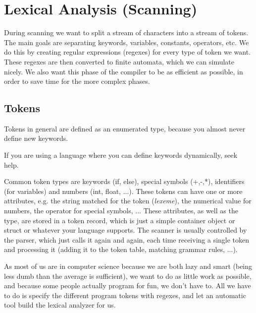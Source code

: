 \documentclass{article}
\begin{document}
\section{Lexical Analysis (Scanning)}
During scanning we want to split a stream of characters into a stream of tokens.
The main goals are separating keywords, variables, constants, operators, etc.
We do this by creating regular expressions (regexes) for every type of token we want.
These regexes are then converted to finite automata, which we can simulate nicely.
We also want this phase of the compiler to be as efficient as possible, in order to save time for the more complex phases.

\subsection{Tokens}
Tokens in general are defined as an enumerated type, because you almost never define new keywords.
\begin{keypointbox}
	If you are using a language where you can define keywords dynamically, seek help.
\end{keypointbox}

Common token types are keywords (if, else), special symbols (+,-,*), identifiers (for variables) and numbers (int, float, ...).
These tokens can have one or more attributes, e.g. the string matched for the token (\emph{lexeme}), the numerical value for numbers, the operator for special symbols, ...
These attributes, as well as the type, are stored in a token record, which is just a simple container object or struct or whatever your language supports.
The scanner is usually controlled by the parser, which just calls it again and again, each time receiving a single token and processing it (adding it to the token table, matching grammar rules, ...).

As most of us are in computer science because we are both lazy and smart (being less dumb than the average is sufficient), we want to do as little work as possible, and because some people actually program for fun, we don't have to.
All we have to do is specify the different program tokens with regexes, and let an automatic tool build the lexical analyzer for us.
\end{document}
